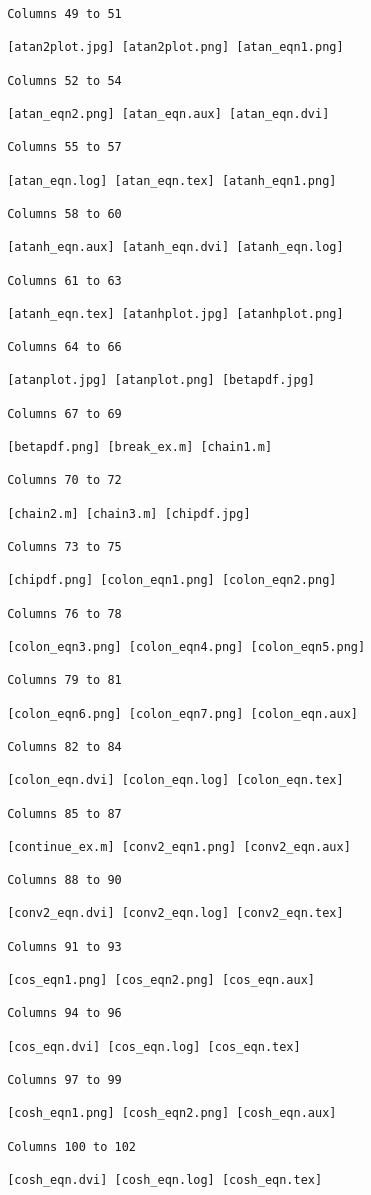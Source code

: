 \begin{verbatim}
 Columns 49 to 51

 [atan2plot.jpg] [atan2plot.png] [atan_eqn1.png] 

 Columns 52 to 54

 [atan_eqn2.png] [atan_eqn.aux] [atan_eqn.dvi] 

 Columns 55 to 57

 [atan_eqn.log] [atan_eqn.tex] [atanh_eqn1.png] 

 Columns 58 to 60

 [atanh_eqn.aux] [atanh_eqn.dvi] [atanh_eqn.log] 

 Columns 61 to 63

 [atanh_eqn.tex] [atanhplot.jpg] [atanhplot.png] 

 Columns 64 to 66

 [atanplot.jpg] [atanplot.png] [betapdf.jpg] 

 Columns 67 to 69

 [betapdf.png] [break_ex.m] [chain1.m] 

 Columns 70 to 72

 [chain2.m] [chain3.m] [chipdf.jpg] 

 Columns 73 to 75

 [chipdf.png] [colon_eqn1.png] [colon_eqn2.png] 

 Columns 76 to 78

 [colon_eqn3.png] [colon_eqn4.png] [colon_eqn5.png] 

 Columns 79 to 81

 [colon_eqn6.png] [colon_eqn7.png] [colon_eqn.aux] 

 Columns 82 to 84

 [colon_eqn.dvi] [colon_eqn.log] [colon_eqn.tex] 

 Columns 85 to 87

 [continue_ex.m] [conv2_eqn1.png] [conv2_eqn.aux] 

 Columns 88 to 90

 [conv2_eqn.dvi] [conv2_eqn.log] [conv2_eqn.tex] 

 Columns 91 to 93

 [cos_eqn1.png] [cos_eqn2.png] [cos_eqn.aux] 

 Columns 94 to 96

 [cos_eqn.dvi] [cos_eqn.log] [cos_eqn.tex] 

 Columns 97 to 99

 [cosh_eqn1.png] [cosh_eqn2.png] [cosh_eqn.aux] 

 Columns 100 to 102

 [cosh_eqn.dvi] [cosh_eqn.log] [cosh_eqn.tex] 


\end{verbatim}

